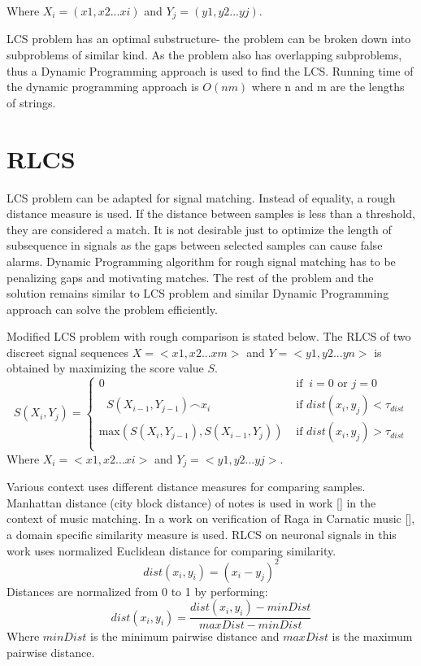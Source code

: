 \documentclass[MTech]{iitmdiss}
\begin{document}
Where $X_i = (x1, x2...xi)$ and $Y_j = (y1, y2...yj)$.

LCS problem has an optimal substructure- the problem can be broken down into subproblems of similar kind. As the problem also has overlapping subproblems, thus a Dynamic Programming approach is used to find the LCS. Running time of the dynamic programming approach is  $O(nm)$ where n and m are the lengths of strings.

\section{RLCS} %
\label{sec:rlcs}
LCS problem can be adapted for signal matching. Instead of equality, a rough distance measure is used. If the distance between samples is less than a threshold, they are considered a match. It is not desirable just to optimize the length of subsequence in signals as the gaps between selected samples can cause false alarms. Dynamic Programming algorithm for rough signal matching has to be penalizing gaps and motivating matches. The rest of the problem and the solution remains similar to LCS problem and similar Dynamic Programming approach can solve the problem efficiently.

Modified LCS problem with rough comparison is stated below. The RLCS of two discreet signal sequences $X = <x1, x2...xm>$ and $Y = <y1, y2...yn>$ is obtained by maximizing the score value $S$.
$$
S\left(X_{i},Y_{j}\right) =
\begin{cases}
  0
& \mbox{ if }\ i = 0 \mbox{ or }  j = 0 \\
  \textrm{  } S\left(X_{i-1},Y_{j-1}\right) \frown x_{i}
& \mbox{ if } dist(x_i , y_j) < \tau_{dist} \\
  \mbox{max}\left(S\left(X_{i},Y_{j-1}\right),S\left(X_{i-1},Y_{j}\right)\right)
& \mbox{ if } dist(x_i , y_j) > \tau_{dist} \\
\end{cases}
$$
Where $X_i = <x1, x2...xi>$ and $Y_j = <y1, y2...yj>$.

Various context uses different distance measures for comparing samples.  Manhattan distance (city block distance) of notes is used in work [\cite{lin2011music}] in the context of music matching. In a work on verification of Raga in Carnatic music [\cite{duttaraga}], a domain specific similarity measure is used. RLCS on neuronal signals in this work uses normalized Euclidean distance for comparing similarity.
$$dist(x_i, y_i) = (x_i - y_j)^2$$
Distances are normalized from 0 to 1 by performing: 
$$dist(x_i, y_i) = \frac{dist(x_i, y_i) - minDist}{maxDist - minDist}$$
Where $minDist$ is the minimum pairwise distance and $maxDist$ is the maximum pairwise distance.
\end{document}
